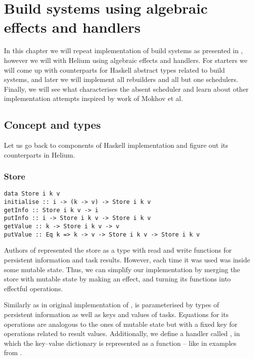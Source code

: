 
\chapter{Build systems using algebraic effects and handlers}

\label{chapter-bsue}

In this chapter we will repeat implementation of build systems as presented in \BSaLC\cite{mokhov2018build}, however we will with Helium using algebraic effects and handlers. For starters we will come up with counterparts for Haskell abstract types related to build systems, and later we will implement all rebuilders and all but one schedulers. Finally, we will see what characterises the absent scheduler and learn about other implementation attempts inspired by work of Mokhov et al.

\section{Concept and types}

Let us go back to components of Haskell implementation and figure out its counterparts in Helium.

\subsection{Store}

\begin{lstlisting}[style=haskell-style]
data Store i k v
initialise :: i -> (k -> v) -> Store i k v
getInfo :: Store i k v -> i
putInfo :: i -> Store i k v -> Store i k v
getValue :: k -> Store i k v -> v
putValue :: Eq k => k -> v -> Store i k v -> Store i k v
\end{lstlisting}

Authors of \BSaLC\cite{mokhov2018build} represented the store as a type with read and write functions for persistent information and task results. However, each time it was used was inside some mutable state. Thus, we can simplify our implementation by merging the store with mutable state by making  an effect, and turning its functions into effectful operations.



Similarly as in original implementation of ,  is parameterised by types of persistent information as well as keys and values of tasks. Equations for its operations are analogous to the ones of mutable state but with a fixed key for operations related to result values. Additionally, we define a handler called , in which the key--value dictionary is represented as a function -- like in examples from \BSaLC{}.

